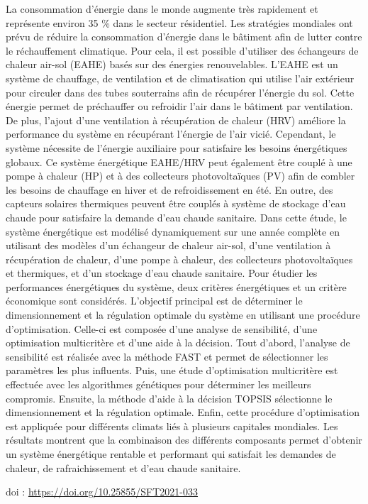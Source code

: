 {\normalsize
La consommation d'énergie dans le monde augmente très rapidement et représente environ 35 \% dans le secteur résidentiel. Les stratégies mondiales ont prévu de réduire la consommation d'énergie dans le bâtiment afin de lutter contre le réchauffement climatique. Pour cela, il est possible d'utiliser des échangeurs de chaleur air-sol (EAHE) basés sur des énergies renouvelables. L'EAHE est un système de chauffage, de ventilation et de climatisation qui utilise l'air extérieur pour circuler dans des tubes souterrains afin de récupérer l'énergie du sol. Cette énergie permet de préchauffer ou refroidir l'air dans le bâtiment par ventilation. De plus, l'ajout d'une ventilation à récupération de chaleur (HRV) améliore la performance du système en récupérant l'énergie de l'air vicié. Cependant, le système nécessite de l'énergie auxiliaire pour satisfaire les besoins énergétiques globaux. Ce système énergétique EAHE/HRV peut également être couplé à une pompe à chaleur (HP) et à des collecteurs photovoltaïques (PV) afin de combler les besoins de chauffage en hiver et de refroidissement en été. En outre, des capteurs solaires thermiques peuvent être couplés à système de stockage d'eau chaude pour satisfaire la demande d'eau chaude sanitaire. Dans cette étude, le système énergétique est modélisé dynamiquement sur une année complète en utilisant des modèles d'un échangeur de chaleur air-sol, d'une ventilation à récupération de chaleur, d'une pompe à chaleur, des collecteurs photovoltaïques et thermiques, et d'un stockage d'eau chaude sanitaire. Pour étudier les performances énergétiques du système, deux critères énergétiques et un critère économique sont considérés. L'objectif principal est de déterminer le dimensionnement et la régulation optimale du système en utilisant une procédure d'optimisation. Celle-ci est composée d'une analyse de sensibilité, d'une optimisation multicritère et d'une aide à la décision. Tout d'abord, l'analyse de sensibilité est réalisée avec la méthode FAST et permet de sélectionner les paramètres les plus influents. Puis, une étude d'optimisation multicritère est effectuée avec les algorithmes génétiques pour déterminer les meilleurs compromis. Ensuite, la méthode d'aide à la décision TOPSIS sélectionne le dimensionnement et la régulation optimale. Enfin, cette procédure d'optimisation est appliquée pour différents climats liés à plusieurs capitales mondiales. Les résultats montrent que la combinaison des différents composants permet d'obtenir un système énergétique rentable et performant qui satisfait les demandes de chaleur, de rafraichissement et d'eau chaude sanitaire.

 \vfill doi : \url{https://doi.org/10.25855/SFT2021-033}

}
 
